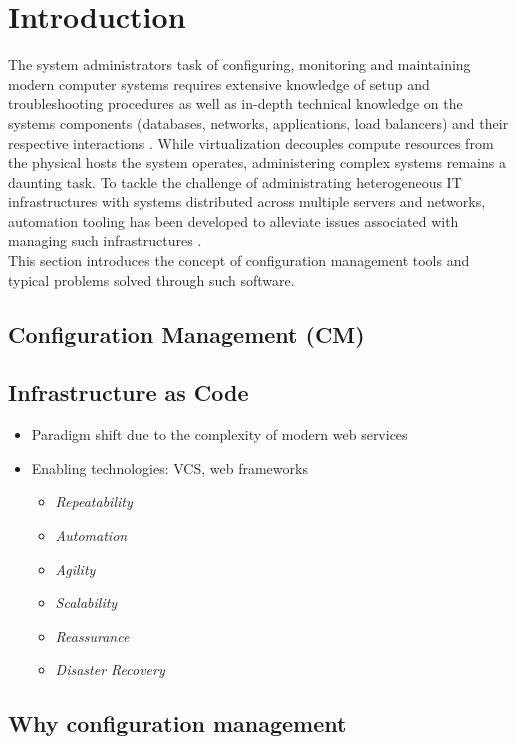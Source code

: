 \section{Introduction}

The system administrators task of configuring, monitoring and maintaining modern computer systems requires extensive knowledge of setup and troubleshooting procedures as well as in-depth technical knowledge on the systems components (databases, networks, applications, load balancers) and their respective interactions \cite{Barrett:2004:FSC:1031607.1031672}. While virtualization decouples compute resources from the physical hosts the system operates, administering complex systems remains a daunting task. To tackle the challenge of administrating heterogeneous IT infrastructures with systems distributed across multiple servers and networks, automation tooling has been developed to alleviate issues associated with managing such infrastructures \cite{Hintsch2016ARO}. \\ This section introduces the concept of configuration management tools and typical problems solved through such software.

\subsection{Configuration Management (CM)}

\subsection{Infrastructure as Code}

\begin{itemize}
\item Paradigm shift due to the complexity of modern web services
\item Enabling technologies: VCS, web frameworks
\begin{itemize}
\item \textit{Repeatability}
\item \textit{Automation}
\item \textit{Agility}
\item \textit{Scalability}
\item \textit{Reassurance}
\item \textit{Disaster Recovery}
\end{itemize}
\end{itemize}

\subsection{Why configuration management}

